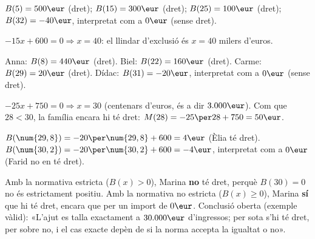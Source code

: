 \begin{solucions}
\begin{sollist}
  \item $B(5)=500\eur$ (dret); $B(15)=300\eur$ (dret); $B(25)=100\eur$
        (dret); $B(32)=-40\eur$, interpretat com a $0\eur$ (sense dret).
  \item $-15x+600=0 \Rightarrow x=40$: el llindar d'exclusió és
        $x=40$ milers d'euros.
  \item Anna: $B(8)=440\eur$ (dret). Biel: $B(22)=160\eur$ (dret). Carme:
        $B(29)=20\eur$ (dret). Dídac: $B(31)=-20\eur$, interpretat com a
        $0\eur$ (sense dret).
  \item $-25x+750=0 \Rightarrow x=30$ (centenars d'euros, és a dir
        $3.000\eur$). Com que $28<30$, la família encara hi té dret:
        $M(28)=-25\per28+750=50\eur$.
  \item $B(\num{29,8})=-20\per\num{29,8}+600=4\eur$ (Èlia té dret). \;
        $B(\num{30,2})=-20\per\num{30,2}+600=-4\eur$, interpretat com a
        $0\eur$ (Farid no en té dret).
  \item Amb la normativa estricta ($B(x)>0$), Marina \textbf{no} té dret,
        perquè $B(30)=0$ no és estrictament positiu. Amb la normativa no
        estricta ($B(x)\geq0$), Marina \textbf{sí} que hi té dret, encara
        que per un import de $0\eur$. Conclusió oberta (exemple vàlid):
        «L'ajut es talla exactament a $30.000\eur$ d'ingressos; per sota
        s'hi té dret, per sobre no, i el cas exacte depèn de si la norma
        accepta la igualtat o no».
\end{sollist}
\end{solucions}
